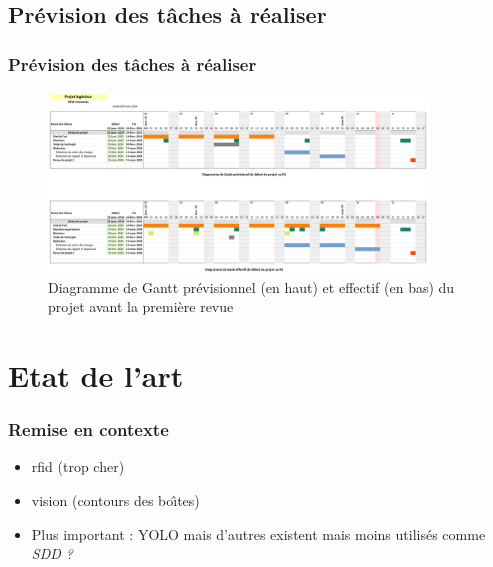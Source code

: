\documentclass[aspectratio = 43]{beamer}
\begin{document}
\subsection{Pr{\'e}vision des t{\^a}ches {\`a} r{\'e}aliser}
\begin{frame}
  \frametitle{Pr{\'e}vision des t{\^a}ches {\`a} r{\'e}aliser}
  \begin{figure}
    \centering
    \includegraphics[width=0.9\textwidth, height=0.7\textheight]{gantt_r1.png}
    \caption{Diagramme de Gantt prévisionnel (en haut) et effectif (en
      bas) du projet avant la première revue}%
    \label{fig:gantt_r1}
  \end{figure}
\end{frame}
%
\section{Etat de l'art}
\begin{frame}
  \frametitle{Remise en contexte}
  \begin{itemize}
  \item rfid (trop cher)
  \item vision (contours des bo{\^\i}tes)
  \item Plus important : YOLO mais d'autres existent mais moins
    utilis{\'e}s comme \textit{SDD ?}
  \end{itemize}
\end{frame}
%
\end{document}
